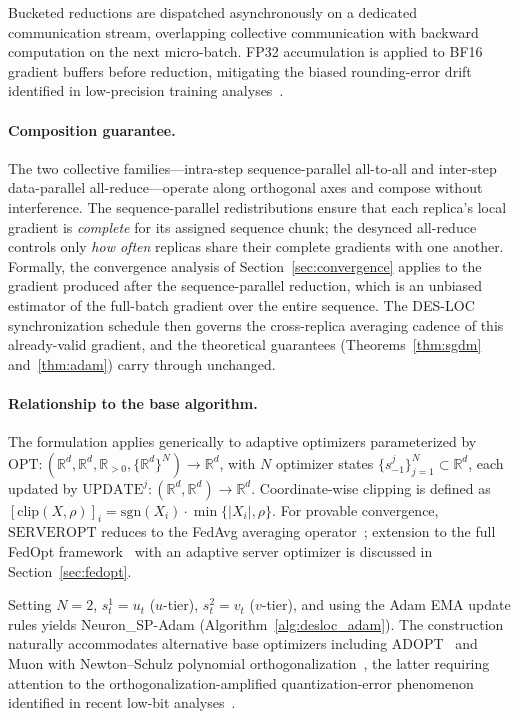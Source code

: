 \documentclass{article}
\begin{document}
Bucketed reductions are dispatched asynchronously on a dedicated
communication stream, overlapping collective communication with backward
computation on the next micro-batch. FP32 accumulation is applied to
BF16 gradient buffers before reduction, mitigating the biased
rounding-error drift identified in low-precision training
analyses~\citep{lowprec2026iclr,moss2026iclr}.

\paragraph{Composition guarantee.}
The two collective families---intra-step sequence-parallel all-to-all and
inter-step data-parallel all-reduce---operate along orthogonal axes and
compose without interference. The sequence-parallel redistributions
ensure that each replica's local gradient is \emph{complete} for its
assigned sequence chunk; the desynced all-reduce controls only
\emph{how often} replicas share their complete gradients with one another.
Formally, the convergence analysis of Section~\ref{sec:convergence}
applies to the gradient produced after the sequence-parallel reduction,
which is an unbiased estimator of the full-batch gradient over the
entire sequence. The DES-LOC synchronization schedule then governs
the cross-replica averaging cadence of this already-valid gradient,
and the theoretical guarantees (Theorems~\ref{thm:sgdm}
and~\ref{thm:adam}) carry through unchanged.

\paragraph{Relationship to the base algorithm.}
The formulation applies generically to adaptive optimizers parameterized by
$\mathrm{OPT} : (\mathbb{R}^d, \mathbb{R}^d, \mathbb{R}_{>0},
\{\mathbb{R}^d\}^N) \to \mathbb{R}^d$, with $N$ optimizer states
$\{s^j_{-1}\}_{j=1}^N \subset \mathbb{R}^d$, each updated by
$\mathrm{UPDATE}^j : (\mathbb{R}^d, \mathbb{R}^d) \to \mathbb{R}^d$.
Coordinate-wise clipping is defined as
$[\mathrm{clip}(X,\rho)]_i = \mathrm{sgn}(X_i) \cdot \min\{|X_i|,\rho\}$.
For provable convergence, $\mathrm{SERVEROPT}$ reduces to the FedAvg
averaging operator~\citep{mcmahan2017communication}; extension to the
full FedOpt framework~\citep{reddi2021adaptive} with an adaptive server
optimizer is discussed in Section~\ref{sec:fedopt}.

Setting $N = 2$, $s^1_t = u_t$ ($u$-tier), $s^2_t = v_t$ ($v$-tier),
and using the Adam EMA update rules yields Neuron\_SP-Adam
(Algorithm~\ref{alg:desloc_adam}). The construction naturally accommodates
alternative base optimizers including ADOPT~\citep{taniguchi2024adopt}
and Muon with Newton--Schulz polynomial
orthogonalization~\citep{muonconvergence2026iclr}, the latter requiring
attention to the orthogonalization-amplified quantization-error phenomenon
identified in recent low-bit analyses~\citep{muonlowbit2026iclr}.
\end{document}

